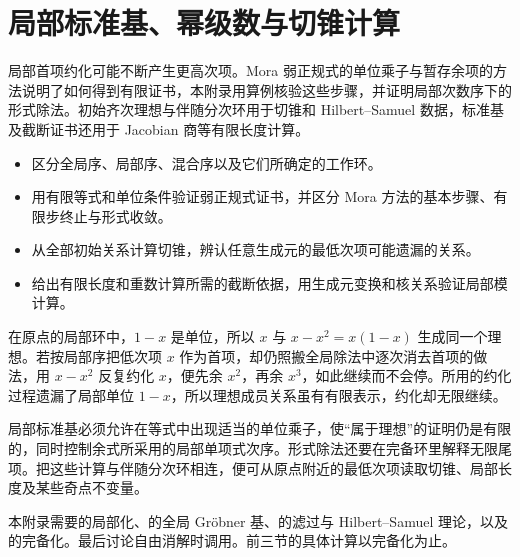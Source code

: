 
\chapter{局部标准基、幂级数与切锥计算}
\label{b3:app:F}



\begin{chapterabstract}
	局部首项约化可能不断产生更高次项。Mora 弱正规式的单位乘子与暂存余项的方法说明了如何得到有限证书，本附录用算例核验这些步骤，并证明局部次数序下的形式除法。初始齐次理想与伴随分次环用于切锥和 Hilbert--Samuel 数据，标准基及截断证书还用于 Jacobian 商等有限长度计算。
\end{chapterabstract}

\begin{learninggoals}
	\begin{itemize}
		\item 区分全局序、局部序、混合序以及它们所确定的工作环。
		\item 用有限等式和单位条件验证弱正规式证书，并区分 Mora 方法的基本步骤、有限步终止与形式收敛。
		\item 从全部初始关系计算切锥，辨认任意生成元的最低次项可能遗漏的关系。
		\item 给出有限长度和重数计算所需的截断依据，用生成元变换和核关系验证局部模计算。
	\end{itemize}
\end{learninggoals}

在原点的局部环中，\(1-x\) 是单位，所以 \(x\) 与 \(x-x^2=x(1-x)\) 生成同一个理想。若按局部序把低次项 \(x\) 作为首项，却仍照搬全局除法中逐次消去首项的做法，用 \(x-x^2\) 反复约化 \(x\)，便先余 \(x^2\)，再余 \(x^3\)，如此继续而不会停。所用的约化过程遗漏了局部单位 \(1-x\)，所以理想成员关系虽有有限表示，约化却无限继续。

\ProseParagraphBreak

局部标准基必须允许在等式中出现适当的单位乘子，使“属于理想”的证明仍是有限的，同时控制余式所采用的局部单项式次序。形式除法还要在完备环里解释无限尾项。把这些计算与伴随分次环相连，便可从原点附近的最低次项读取切锥、局部长度及某些奇点不变量。

\ProseParagraphBreak

本附录需要的局部化、的全局 Gröbner 基、的滤过与 Hilbert--Samuel 理论，以及的完备化。最后讨论自由消解时调用。前三节的具体计算以完备化为止。

